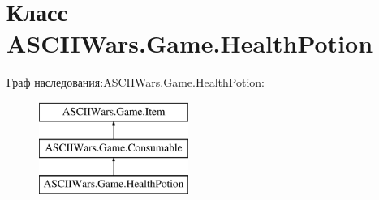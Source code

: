 \hypertarget{class_a_s_c_i_i_wars_1_1_game_1_1_health_potion}{}\section{Класс A\+S\+C\+I\+I\+Wars.\+Game.\+Health\+Potion}
\label{class_a_s_c_i_i_wars_1_1_game_1_1_health_potion}
Граф наследования\+:A\+S\+C\+I\+I\+Wars.\+Game.\+Health\+Potion\+:\begin{figure}[H]
\begin{center}
\leavevmode
\includegraphics[height=3.000000cm]{class_a_s_c_i_i_wars_1_1_game_1_1_health_potion}
\end{center}
\end{figure}
